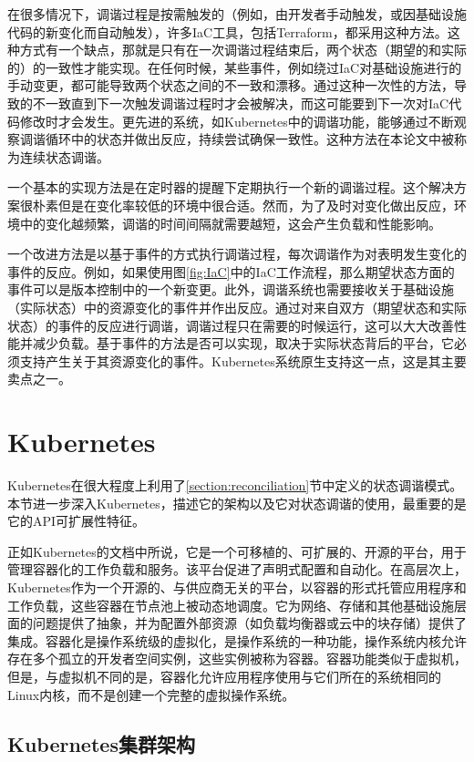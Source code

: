 \documentclass[macfonts,master]{njuthesis}
\begin{document}
在很多情况下，调谐过程是按需触发的（例如，由开发者手动触发，或因基础设施代码的新变化而自动触发），许多IaC工具，包括Terraform，都采用这种方法。这种方式有一个缺点，那就是只有在一次调谐过程结束后，两个状态（期望的和实际的）的一致性才能实现。在任何时候，某些事件，例如绕过IaC对基础设施进行的手动变更，都可能导致两个状态之间的不一致和漂移。通过这种一次性的方法，导致的不一致直到下一次触发调谐过程时才会被解决，而这可能要到下一次对IaC代码修改时才会发生。更先进的系统，如Kubernetes中的调谐功能，能够通过不断观察调谐循环中的状态并做出反应，持续尝试确保一致性。这种方法在本论文中被称为连续状态调谐。

一个基本的实现方法是在定时器的提醒下定期执行一个新的调谐过程。这个解决方案很朴素但是在变化率较低的环境中很合适。然而，为了及时对变化做出反应，环境中的变化越频繁，调谐的时间间隔就需要越短，这会产生负载和性能影响。

一个改进方法是以基于事件的方式执行调谐过程，每次调谐作为对表明发生变化的事件的反应。例如，如果使用图\ref{fig:IaC}中的IaC工作流程，那么期望状态方面的事件可以是版本控制中的一个新变更。此外，调谐系统也需要接收关于基础设施（实际状态）中的资源变化的事件并作出反应。通过对来自双方（期望状态和实际状态）的事件的反应进行调谐，调谐过程只在需要的时候运行，这可以大大改善性能并减少负载。基于事件的方法是否可以实现，取决于实际状态背后的平台，它必须支持产生关于其资源变化的事件。Kubernetes系统原生支持这一点，这是其主要卖点之一。

\section{Kubernetes}

Kubernetes在很大程度上利用了\ref{section:reconciliation}节中定义的状态调谐模式。本节进一步深入Kubernetes，描述它的架构以及它对状态调谐的使用，最重要的是它的API可扩展性特征。

正如Kubernetes的文档中所说，它是一个可移植的、可扩展的、开源的平台，用于管理容器化的工作负载和服务。该平台促进了声明式配置和自动化\cite{whatisk8s}。在高层次上，Kubernetes作为一个开源的、与供应商无关的平台，以容器的形式托管应用程序和工作负载，这些容器在节点池上被动态地调度。它为网络、存储和其他基础设施层面的问题提供了抽象，并为配置外部资源（如负载均衡器或云中的块存储）提供了集成。容器化是操作系统级的虚拟化，是操作系统的一种功能，操作系统内核允许存在多个孤立的开发者空间实例，这些实例被称为容器。容器功能类似于虚拟机，但是，与虚拟机不同的是，容器化允许应用程序使用与它们所在的系统相同的Linux内核，而不是创建一个完整的虚拟操作系统。

\subsection{Kubernetes集群架构}
\end{document}
